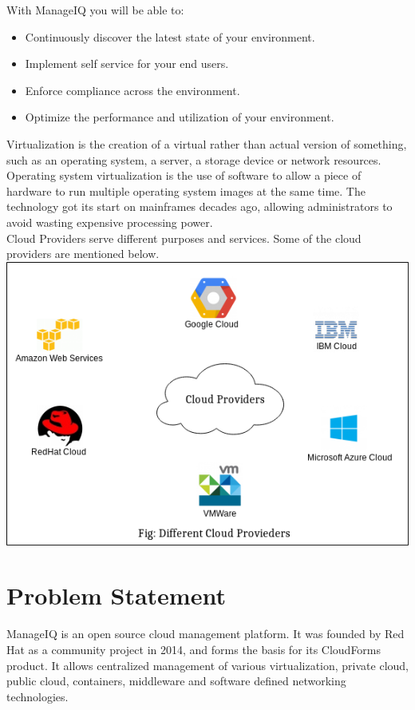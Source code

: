 \documentclass[a4paper,12pt]{report}
\begin{document}
With ManageIQ you will be able to:
\begin{itemize}
	\item Continuously discover the latest state of your environment.
	\item Implement self service for your end users.
	\item Enforce compliance across the environment.
	\item Optimize the performance and utilization of your environment.
\end{itemize}

Virtualization is the creation of a virtual rather than actual version of something, such as an operating system, a server, a storage device or network resources.\\

Operating system virtualization is the use of software to allow a piece of hardware to run multiple operating system images at the same time. The technology got its start on mainframes decades ago, allowing administrators to avoid wasting expensive processing power.\\

Cloud Providers serve different purposes and services. Some of the cloud providers are mentioned  below.\\

\includegraphics[scale=.75]{cloud_providers}

\chapter{Problem Statement}
ManageIQ is an open source cloud management platform. It was founded by Red Hat as a community project in 2014, and forms the basis for its CloudForms product. It allows centralized management of various virtualization, private cloud, public cloud, containers, middleware and software defined networking technologies.\\
\end{document}
